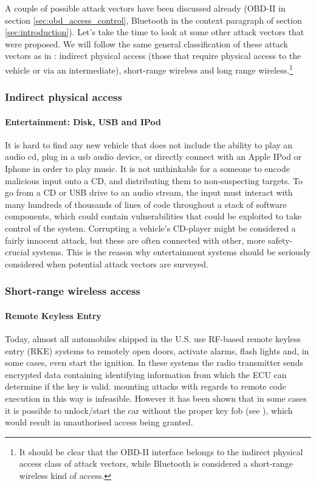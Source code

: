 \documentclass[11pt]{article}
\begin{document}
A couple of possible attack vectors have been discussed already (OBD-II in section \ref{sec:obd_access_control}, Bluetooth in the context paragraph of section \ref{sec:introduction}). Let's take the time to look at some other attack vectors that were proposed. We will follow the same general classification of these attack vectors as in \cite{Kosher}: indirect physical access (those that require physical access to the vehicle or via an intermediate), short-range wireless and long range wireless.\footnote{It should be clear that the OBD-II interface belongs to the indirect physical access class of attack vectors, while Bluetooth is considered a short-range wireless kind of access.}

\subsubsection{Indirect physical access}

\paragraph{Entertainment: Disk, USB and IPod} It is hard to find any new vehicle that does not include the ability to play an audio cd, plug in a usb audio device, or directly connect with an Apple IPod or Iphone in order to play music. It is not unthinkable for a someone to encode malicious input onto a CD, and distributing them to non-suspecting targets. To go from a CD or USB drive to an audio stream, the input must interact with many hundreds of thousands of lines of code throughout a stack of software components, which could contain vulnerabilities that could be exploited to take control of the system\cite{Pike15}. Corrupting a vehicle's CD-player might be considered a fairly innocent attack, but these are often connected with other, more safety-crucial systems. This is the reason why entertainment systems should be seriously considered when potential attack vectors are surveyed.

\subsubsection{Short-range wireless access}

\paragraph{Remote Keyless Entry} Today, almost all automobiles shipped in the U.S. use RF-based remote keyless entry (RKE) systems to remotely open doors, activate alarms, flash lights and, in some cases, even start the ignition\cite{Kosher}. In these systems the radio transmitter sends encrypted data containing identifying information from which the ECU can determine if the key is valid\cite{MillerA}. mounting attacks with regards to remote code execution in this way is infeasible. However it has been shown that in some cases it is possible to unlock/start the car without the proper key fob (see \cite{KeeLoq}), which would result in unauthorised access being granted.
\end{document}

